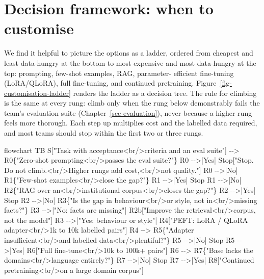 \documentclass[
  letterpaper,
  11pt]{scrbook}
\newenvironment{Shaded}{\begin{snugshade}}{\end{snugshade}}
\newcommand{\NormalTok}[1]{\textcolor[rgb]{0.00,0.23,0.31}{#1}}
\begin{document}
\section{Decision framework: when to
customise}\label{decision-framework-when-to-customise}

We find it helpful to picture the options as a ladder, ordered from
cheapest and least data-hungry at the bottom to most expensive and most
data-hungry at the top: prompting, few-shot examples, RAG, parameter-
efficient fine-tuning (LoRA/QLoRA), full fine-tuning, and continued
pretraining. Figure~\ref{fig-customisation-ladder} renders the ladder as
a decision tree. The rule for climbing is the same at every rung: climb
only when the rung below demonstrably fails the team's evaluation suite
(Chapter~\ref{sec-evaluation}), never because a higher rung feels more
thorough. Each step up multiplies cost and the labelled data required,
and most teams should stop within the first two or three rungs.

\begin{Shaded}
\begin{Highlighting}[]
\NormalTok{flowchart TB}
\NormalTok{  S["Task with acceptance\textless{}br/\textgreater{}criteria and an eval suite"] {-}{-}\textgreater{} R0\{"Zero{-}shot prompting\textless{}br/\textgreater{}passes the eval suite?"\}}
\NormalTok{  R0 {-}{-}\textgreater{}|Yes| Stop["Stop. Do not climb.\textless{}br/\textgreater{}Higher rungs add cost,\textless{}br/\textgreater{}not quality."]}
\NormalTok{  R0 {-}{-}\textgreater{}|No| R1\{"Few{-}shot examples\textless{}br/\textgreater{}close the gap?"\}}
\NormalTok{  R1 {-}{-}\textgreater{}|Yes| Stop}
\NormalTok{  R1 {-}{-}\textgreater{}|No| R2\{"RAG over an\textless{}br/\textgreater{}institutional corpus\textless{}br/\textgreater{}closes the gap?"\}}
\NormalTok{  R2 {-}{-}\textgreater{}|Yes| Stop}
\NormalTok{  R2 {-}{-}\textgreater{}|No| R3\{"Is the gap in behaviour\textless{}br/\textgreater{}or style, not in\textless{}br/\textgreater{}missing facts?"\}}
\NormalTok{  R3 {-}{-}\textgreater{}|"No: facts are missing"| R2b["Improve the retrieval\textless{}br/\textgreater{}corpus, not the model"]}
\NormalTok{  R3 {-}{-}\textgreater{}|"Yes: behaviour or style"| R4["PEFT: LoRA / QLoRA adapter\textless{}br/\textgreater{}1k to 10k labelled pairs"]}
\NormalTok{  R4 {-}{-}\textgreater{} R5\{"Adapter insufficient\textless{}br/\textgreater{}and labelled data\textless{}br/\textgreater{}plentiful?"\}}
\NormalTok{  R5 {-}{-}\textgreater{}|No| Stop}
\NormalTok{  R5 {-}{-}\textgreater{}|Yes| R6["Full fine{-}tune\textless{}br/\textgreater{}10k to 100k+ pairs"]}
\NormalTok{  R6 {-}{-}\textgreater{} R7\{"Base lacks the domain\textquotesingle{}s\textless{}br/\textgreater{}language entirely?"\}}
\NormalTok{  R7 {-}{-}\textgreater{}|No| Stop}
\NormalTok{  R7 {-}{-}\textgreater{}|Yes| R8["Continued pretraining\textless{}br/\textgreater{}on a large domain corpus"]}
\end{Highlighting}
\end{Shaded}
\end{document}
